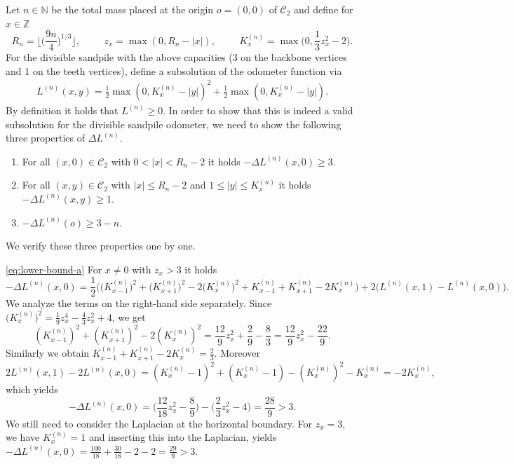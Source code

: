\documentclass[11pt]{article}
\newcommand{\N}{\mathbb{N}}
\newcommand{\Z}{\mathbb{Z}}
\begin{document}
Let $n\in\N$ be the total mass placed at the origin $o=(0,0)$ of $\mathcal{C}_2$ and define for $x\in\Z$
$$R_n=\Big\lfloor\Big(\frac{9n}{4}\Big)^{1/3}\Big\rfloor,\hspace{1cm}z_x=\max(0,R_n-|x|),\hspace{1cm}
K_x^{(n)}=\max\Big(0,\frac{1}{3}z_x^2-2\Big).$$
For the divisible sandpile with the above capacities (3 on the backbone vertices  and 1 on the teeth vertices), define a subsolution of the odometer function via
\begin{align}\label{eq:lower-bound-function}L^{(n)}(x,y)=\frac{1}{2}\max(0,K_x^{(n)}-|y|)^2+\frac{1}{2}\max(0,K_x^{(n)}-|y|).\end{align}
By definition it holds that $L^{(n)}\geq 0$. In order to show that this is indeed a valid subsolution for the divisible sandpile odometer, we need to show the following three properties of $\Delta L^{(n)}$.
\begin{enumerate}[label=(\alph*)]
    \item\label{eq:lower-bound-a} For all $(x,0)\in\mathcal{C}_2$ with $0<|x|< R_n-2$ it holds $-\Delta L^{(n)}(x,0)\geq 3$.
    \item\label{eq:lower-bound-b} For all $(x,y)\in\mathcal{C}_2$ with $|x|\leq R_n-2$ and $1\leq |y|\leq K_x^{(n)}$  it holds $-\Delta L^{(n)}(x,y)\geq 1$.
    \item\label{eq:lower-bound-c} $-\Delta L^{(n)}(o)\geq 3-n$.
\end{enumerate}
We verify these three properties one by one.

\ref{eq:lower-bound-a} For $x\neq 0$ with $z_x>3$ it holds
$$-\Delta L^{(n)}(x,0) =\frac{1}{2}\Big(\big(K_{x-1}^{(n)}\big)^2+\big(K_{x+1}^{(n)}\big)^2-2\big(K_{x}^{(n)}\big)^2 +K_{x-1}^{(n)}+K_{x+1}^{(n)}-2K_{x}^{(n)}\Big)+2\big(L^{(n)}(x,1)-L^{(n)}(x,0)\big).$$
We analyze the terms on the right-hand side separately. Since $\big(K_x^{(n)}\big)^2=\frac{1}{9}z_x^4-\frac{4}{3}z_x^2+4$, we get
$$(K_{x-1}^{(n)})^2+(K_{x+1}^{(n)})^2-2(K_{x}^{(n)})^2=\frac{12}{9}z_x^2+\frac{2}{9}-\frac{8}{3}=\frac{12}{9}z_x^2-\frac{22}{9}.$$
Similarly we obtain $K_{x-1}^{(n)}+K_{x+1}^{(n)}-2K_{x}^{(n)}=\frac{2}{3}$. Moreover
$$2L^{(n)}(x,1)-2L^{(n)}(x,0)=(K^{(n)}_x-1)^2+(K_x^{(n)}-1)-(K_x^{(n)})^2-K_x^{(n)}=-2K_x^{(n)},$$
which yields
$$-\Delta L^{(n)}(x,0)=\Big(\frac{12}{18}z_x^2-\frac{8}{9}\Big)-\Big(\frac{2}{3}z_x^2-4\Big)=\frac{28}{9}>3.$$
We still need to consider the Laplacian at the horizontal boundary. For $z_x=3$, we have $K_x^{(n)}=1$ and inserting this into the Laplacian, yields
$-\Delta L^{(n)}(x,0)=\frac{100}{18}+\frac{30}{18}-2-2=\frac{29}{9}>3.$ 
\end{document}
